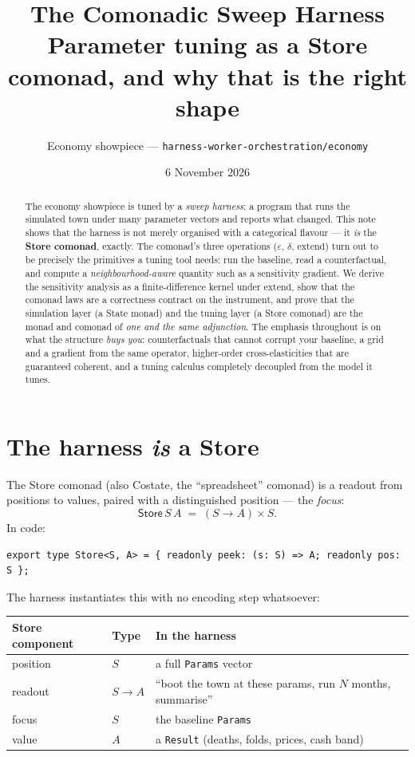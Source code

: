 \documentclass[11pt]{article}
\title{\textbf{The Comonadic Sweep Harness}\\[2pt]
\large Parameter tuning as a Store comonad, and why that is the right shape}
\author{Economy showpiece --- \texttt{harness-worker-orchestration/economy}}
\date{6 November 2026}
\newcommand{\Store}{\mathsf{Store}}
\newcommand{\extract}{\varepsilon}
\newcommand{\duplicate}{\delta}
\begin{document}
\maketitle

\begin{abstract}
\noindent The economy showpiece is tuned by a \emph{sweep harness}: a program
that runs the simulated town under many parameter vectors and reports what
changed. This note shows that the harness is not merely organised with a
categorical flavour --- it \emph{is} the \textbf{Store comonad}, exactly. The
comonad's three operations ($\extract$, $\duplicate$, $\mathrm{extend}$) turn
out to be precisely the primitives a tuning tool needs: run the baseline, read a
counterfactual, and compute a \emph{neighbourhood-aware} quantity such as a
sensitivity gradient. We derive the sensitivity analysis as a finite-difference
kernel under $\mathrm{extend}$, show that the comonad laws are a correctness
contract on the instrument, and prove that the simulation layer (a State monad)
and the tuning layer (a Store comonad) are the monad and comonad of \emph{one and
the same adjunction}. The emphasis throughout is on what the structure
\emph{buys you}: counterfactuals that cannot corrupt your baseline, a grid and a
gradient from the same operator, higher-order cross-elasticities that are
guaranteed coherent, and a tuning calculus completely decoupled from the model
it tunes.
\end{abstract}

\section{The harness \emph{is} a Store}

The Store comonad (also Costate, the ``spreadsheet'' comonad) is a readout from
positions to values, paired with a distinguished position --- the \emph{focus}:
\[
  \Store\,S\,A \;=\; (S \to A) \times S.
\]
In code:

\begin{lstlisting}
export type Store<S, A> = { readonly peek: (s: S) => A; readonly pos: S };
\end{lstlisting}

The harness instantiates this with no encoding step whatsoever:

\begin{center}
\begin{tabular}{@{}lll@{}}
\toprule
Store component & Type & In the harness \\
\midrule
position & $S$ & a full \texttt{Params} vector \\
readout  & $S \to A$ & ``boot the town at these params, run $N$ months, summarise'' \\
focus    & $S$ & the baseline \texttt{Params} \\
value    & $A$ & a \texttt{Result} (deaths, folds, prices, cash band) \\
\bottomrule
\end{tabular}
\end{center}
\end{document}
